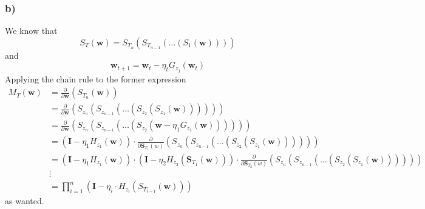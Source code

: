 \subsubsection*{{\bf b)}}
We know that
\[
    S_{T} \left( \bm{w} \right) = S_{T_{n}} \left( S_{T_{n-1}} \left( \ldots \left( S_{1} \left( \bm{w} \right) \right) \right) \right)
\]
and
\[
    \bm{w}_{t+1} = \bm{w}_{t} - \eta_{t} G_{z_{j}} \left( \bm{w}_{t} \right)
\]
Applying the chain rule to the former expression
\begingroup
\allowdisplaybreaks
\begin{align*}
    M_{T} \left( \bm{w} \right) &= \frac{\partial}{\partial \bm{w}} ( S_{T_{n}} \left( \bm{w} \right) ) \\
    &= \frac{\partial}{\partial \bm{w}} ( S_{z_{n}} ( S_{z_{n-1}} ( \ldots ( S_{z_{2}} (S_{z_{1}} ( \bm{w} )) ))  ) ) \\
    &= \frac{\partial}{\partial \bm{w}} ( S_{z_{n}} ( S_{z_{n-1}} ( \ldots ( S_{z_{2}} ( \bm{w} - \eta_{1} G_{z_{1}} \left( \bm{w} \right) ) ))  ) ) \\
    &= (\bm{I} - \eta_{1} H_{z_{1}} (\bm{w})) \cdot \frac{\partial}{\partial \bm{S}_{T_{1}} (w)} ( S_{z_{n}} ( S_{z_{n-1}} ( \ldots ( S_{z_{2}} (S_{z_{1}} ( \bm{w} )) ))  ) ) \\
    &= (\bm{I} - \eta_{1} H_{z_{1}} (\bm{w})) \cdot (\bm{I} - \eta_{2} H_{z_{2}} (\bm{S}_{T_{1}} ( \bm{w} ))) \cdot \frac{\partial}{\partial \bm{S}_{T_{2}} (w)} ( S_{z_{n}} ( S_{z_{n-1}} ( \ldots ( S_{z_{2}} (S_{z_{1}} ( \bm{w} )) ))  ) ) \\
    &\vdots \\
    &= \prod_{i=1}^{n} \left( \bm{I} - \eta_{i} \cdot H_{z_{i}} \left( S_{T_{i-1}} \left( \bm{w} \right) \right) \right)
\end{align*}
\endgroup
as wanted.